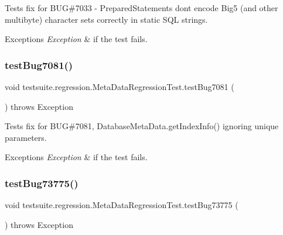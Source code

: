 Tests fix for B\+UG\#7033 -\/ Prepared\+Statements don\textquotesingle{}t encode Big5 (and other multibyte) character sets correctly in static S\+QL strings.


\begin{DoxyExceptions}{Exceptions}
{\em Exception} & if the test fails. \\
\hline
\end{DoxyExceptions}
\mbox{\label{classtestsuite_1_1regression_1_1_meta_data_regression_test_af6e2170c6b9b3b1ff9beddf8dc1c2aa9}} 
\subsubsection{\texorpdfstring{test\+Bug7081()}{testBug7081()}}
{\footnotesize\ttfamily void testsuite.\+regression.\+Meta\+Data\+Regression\+Test.\+test\+Bug7081 (\begin{DoxyParamCaption}{ }\end{DoxyParamCaption}) throws Exception}

Tests fix for B\+UG\#7081, Database\+Meta\+Data.\+get\+Index\+Info() ignoring \textquotesingle{}unique\textquotesingle{} parameters.


\begin{DoxyExceptions}{Exceptions}
{\em Exception} & if the test fails. \\
\hline
\end{DoxyExceptions}
\mbox{\label{classtestsuite_1_1regression_1_1_meta_data_regression_test_ab626be438fcdf7bbb6d528f00a7dda1d}} 
\subsubsection{\texorpdfstring{test\+Bug73775()}{testBug73775()}}
{\footnotesize\ttfamily void testsuite.\+regression.\+Meta\+Data\+Regression\+Test.\+test\+Bug73775 (\begin{DoxyParamCaption}{ }\end{DoxyParamCaption}) throws Exception}

